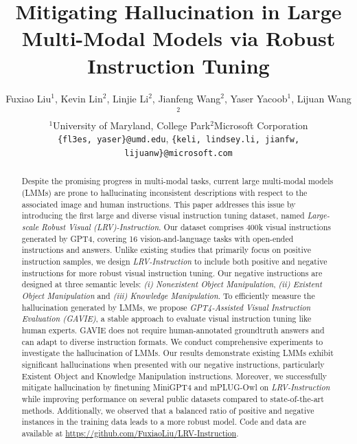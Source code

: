 \documentclass{article} %
\title{Mitigating Hallucination in Large Multi-Modal Models via Robust Instruction Tuning}
\author{Fuxiao Liu$^1$, Kevin Lin$^2$, Linjie Li$^2$, Jianfeng Wang$^2$, Yaser Yacoob$^1$, Lijuan Wang$^2$\\ 
$^1$University of Maryland, College Park\quad $^2$Microsoft Corporation\\
\texttt{\small\{fl3es, yaser\}@umd.edu}, 
\texttt{\small\{keli, lindsey.li, jianfw, lijuanw\}@microsoft.com}
}
\begin{document}
\maketitle

\begin{abstract}
Despite the promising progress in multi-modal tasks, current large multi-modal models (LMMs) are prone to hallucinating inconsistent descriptions with respect to the associated image and human instructions. 
This paper addresses this issue by introducing the first large and diverse visual instruction tuning dataset, named \textit{Large-scale Robust Visual (LRV)-Instruction}.
Our dataset comprises 400k visual instructions generated by GPT4, covering 16 vision-and-language tasks with open-ended instructions and answers. 
Unlike existing studies that primarily focus on positive instruction samples, we design \textit{LRV-Instruction} to include both positive and negative instructions for more robust visual instruction tuning.
Our negative instructions are designed at three semantic levels: \textit{(i) Nonexistent Object Manipulation}, \textit{(ii) Existent Object Manipulation} and \textit{(iii) Knowledge Manipulation}. To efficiently measure the hallucination generated by LMMs, we propose \textit{GPT4-Assisted Visual Instruction Evaluation (GAVIE)}, a stable approach to evaluate visual instruction tuning like human experts. GAVIE does not require human-annotated groundtruth answers and can adapt to diverse instruction formats. We conduct comprehensive experiments to investigate the hallucination of LMMs.  
Our results demonstrate existing LMMs exhibit significant hallucinations when presented with our negative instructions, particularly Existent Object and Knowledge Manipulation instructions.
Moreover, we successfully mitigate hallucination by finetuning MiniGPT4 and mPLUG-Owl on \textit{LRV-Instruction} while improving performance on several public datasets compared to state-of-the-art methods.
Additionally, we observed that a balanced ratio of positive and negative instances in the training data leads to a more robust model. Code and data are available at \url{https://github.com/FuxiaoLiu/LRV-Instruction}.
\end{abstract}
\end{document}
